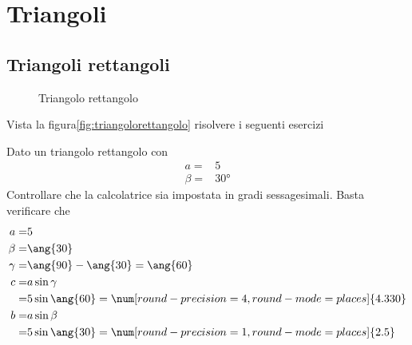 \chapter{Triangoli}
\label{cha:trigonometriatriangoli}
 \section{Triangoli rettangoli}
 
\begin{figure}
	\centering
	
	\caption{Triangolo rettangolo}
	\label{fig:triangolorettangolo}
\end{figure}

Vista la figura\nobs\vref{fig:triangolorettangolo} risolvere i seguenti esercizi
 \begin{exercise}
 	Dato un triangolo rettangolo con
 	\begin{align*}
 	a=&5\\
 	\beta=&\ang{30}
 	\end{align*}
\tcblower
Controllare che la calcolatrice sia impostata in gradi sessagesimali.
Basta verificare che \testgradi 
\begin{align*}
a=&5\\
\beta=&\ang{30}\\
\gamma=&\ang{90}-\ang{30}=\ang{60}\\
c=&a\sin\gamma\\
=& 5\sin\ang{60}=\num[round-precision=\lungarrotandamento,round-mode=places]{4.330}\\
b=&a\sin\beta\\
=& 5\sin\ang{30}=\num[round-precision=1,round-mode=places]{2.5}
\end{align*}
 \end{exercise}
 
